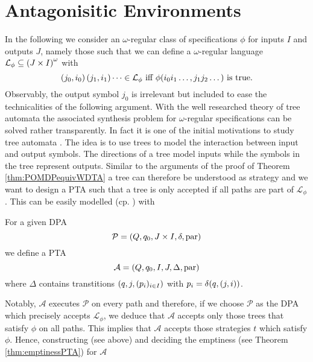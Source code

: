 \section{Antagonisitic Environments}
In the following we consider an $\omega$-regular class of specifications 
$\phi$ for inputs $I$ and outputs $J$, namely those such that we can define a 
$\omega$-regular language $\mathcal{L}_{\phi}\subseteq 
\left(J\times I\right)^{\omega}$ with
\begin{equation}
  \left(j_{0}, i_{0}\right)\left(j_{1}, i_{1}\right)\dots\in\mathcal{L}_{\phi}
  \text{ iff }
  \phi(i_{0}i_{1}\dots, j_{1}j_{2}\dots)\text{ is true.}
  \label{eq:omegaregularphi}
\end{equation}
Observably, the output symbol $j_{0}$ is irrelevant but included to ease the 
technicalities of the following argument. With the well researched theory of
tree automata the associated synthesis problem for $\omega$-regular 
specifications can be solved rather transparently. In fact it is one of the 
initial motivations to study tree automata \cite{AutoInfObj}. The idea is to 
use trees to model the interaction between input and output symbols. The 
directions of a tree model inputs while the symbols in the tree represent 
outputs. Similar to the arguments of the proof of Theorem 
\ref{thm:POMDPequivWDTA} a tree can therefore be understood as strategy and we 
want to design a \ac{PTA} such that a tree is only accepted if all paths are 
part of $\mathcal{L}_{\phi}$. This can be easily modelled 
(cp. \cite[Lemma 15]{AutoInfObj}) with
\begin{definition}
  For a given \ac{DPA}
  \begin{equation*}
    \mathcal{P} = \left(Q, q_{0}, J\times I, \delta, \operatorname{par}\right)
  \end{equation*}
  we define a \ac{PTA}
  \begin{equation*}
    \mathcal{A} = \left(Q, q_{0}, I, J, \Delta, \operatorname{par}\right)
  \end{equation*}
  where $\Delta$ contains transtitions $\left(q, j, (p_{i})_{i\in I}\right)$ with
  $p_{i} = \delta(q, \left(j, i\right))$.
\end{definition}
Notably, $\mathcal{A}$ executes $\mathcal{P}$ on every path and therefore, if 
we choose $\mathcal{P}$ as the \ac{DPA} which precisely accepts 
$\mathcal{L}_{\phi}$, we deduce that $\mathcal{A}$ accepts only those trees 
that satisfy $\phi$ on all paths. This implies that $\mathcal{A}$ accepts those
strategies $t$ which satisfy $\phi$. Hence, constructing (see above) and 
deciding the emptiness (see Theorem \ref{thm:emptinessPTA}) for $\mathcal{A}$ 

